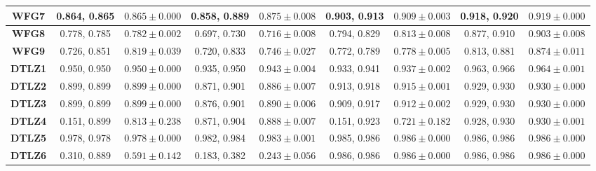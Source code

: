 \begin{table*}[t]
{\begin{tabular}{c|c|c|c|c|c|c|c|c|}
\multicolumn{1}{|c|}{\textbf{WFG7}}  & 0.864, 0.865            & $0.865 \pm 0.000$       & 0.858, 0.889            & $0.875 \pm 0.008$       & 0.903, 0.913            & $0.909 \pm 0.003$       & 0.918, 0.920            & $0.919 \pm 0.000$       \\ \hline
\multicolumn{1}{|c|}{\textbf{WFG8}}  & 0.778, 0.785            & $0.782 \pm 0.002$       & 0.697, 0.730            & $0.716 \pm 0.008$       & 0.794, 0.829            & $0.813 \pm 0.008$       & 0.877, 0.910            & $0.903 \pm 0.008$       \\ \hline
\multicolumn{1}{|c|}{\textbf{WFG9}}  & 0.726, 0.851            & $0.819 \pm 0.039$       & 0.720, 0.833            & $0.746 \pm 0.027$       & 0.772, 0.789            & $0.778 \pm 0.005$       & 0.813, 0.881            & $0.874 \pm 0.011$       \\ \hline
\multicolumn{1}{|c|}{\textbf{DTLZ1}} & 0.950, 0.950            & $0.950 \pm 0.000$       & 0.935, 0.950            & $0.943 \pm 0.004$       & 0.933, 0.941            & $0.937 \pm 0.002$       & 0.963, 0.966            & $0.964 \pm 0.001$       \\ \hline
\multicolumn{1}{|c|}{\textbf{DTLZ2}} & 0.899, 0.899            & $0.899 \pm 0.000$       & 0.871, 0.901            & $0.886 \pm 0.007$       & 0.913, 0.918            & $0.915 \pm 0.001$       & 0.929, 0.930            & $0.930 \pm 0.000$       \\ \hline
\multicolumn{1}{|c|}{\textbf{DTLZ3}} & 0.899, 0.899            & $0.899 \pm 0.000$       & 0.876, 0.901            & $0.890 \pm 0.006$       & 0.909, 0.917            & $0.912 \pm 0.002$       & 0.929, 0.930            & $0.930 \pm 0.000$       \\ \hline
\multicolumn{1}{|c|}{\textbf{DTLZ4}} & 0.151, 0.899            & $0.813 \pm 0.238$       & 0.871, 0.904            & $0.888 \pm 0.007$       & 0.151, 0.923            & $0.721 \pm 0.182$       & 0.928, 0.930            & $0.930 \pm 0.001$       \\ \hline
\multicolumn{1}{|c|}{\textbf{DTLZ5}} & 0.978, 0.978            & $0.978 \pm 0.000$       & 0.982, 0.984            & $0.983 \pm 0.001$       & 0.985, 0.986            & $0.986 \pm 0.000$       & 0.986, 0.986            & $0.986 \pm 0.000$       \\ \hline
\multicolumn{1}{|c|}{\textbf{DTLZ6}} & 0.310, 0.889            & $0.591 \pm 0.142$       & 0.183, 0.382            & $0.243 \pm 0.056$       & 0.986, 0.986            & $0.986 \pm 0.000$       & 0.986, 0.986            & $0.986 \pm 0.000$       \\ \hline

\end{tabular}}
\end{table*}
